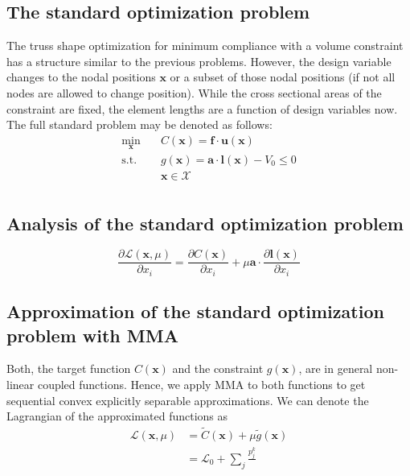 \subsection{The standard optimization problem}
The truss shape optimization for minimum compliance with a volume constraint has a structure similar to the previous problems. However, the design variable changes to the nodal positions $\mathbf{x}$ or a subset of those nodal positions (if not all nodes are allowed to change position). While the cross sectional areas of the constraint are fixed, the element lengths are a function of design variables now. The full standard problem may be denoted as follows:
\begin{equation}
    \begin{aligned}
        \min_{\mathbf{x}} \quad & C(\mathbf{x}) = \mathbf{f} \cdot \mathbf{u}(\mathbf{x})\\
        \textrm{s.t.} \quad & g(\mathbf{x}) = \mathbf{a} \cdot \mathbf{l}(\mathbf{x}) - V_0 \le 0  \\
                            & \mathbf{x} \in \mathcal{X}\\
    \end{aligned}
    \label{eq:shape_optimization}
\end{equation}

\subsection{Analysis of the standard optimization problem}

\begin{equation}
    \frac{\partial \mathcal{L} (\mathbf{x}, \mu)}{\partial x_i} 
    = \frac{\partial C (\mathbf{x})}{\partial x_i} + \mu \mathbf{a} \cdot \frac{\partial \mathbf{l}(\mathbf{x})}{\partial x_i}
    \label{eq:lagrange_truss_shape_problem}
\end{equation}

\subsection{Approximation of the standard optimization problem with MMA}

Both, the target function $C(\mathbf{x})$ and the constraint $g(\mathbf{x})$, are in general non-linear coupled functions. Hence, we apply MMA to both functions to get sequential convex explicitly separable approximations. We can denote the Lagrangian of the approximated functions as 
\begin{align}
    \mathcal{L}(\mathbf{x}, \mu) &= \tilde{C}(\mathbf{x}) + \mu \tilde{g}(\mathbf{x}) \\
    &= \mathcal{L}_0 + \sum_j \frac{p_j^k}{}
\end{align}

